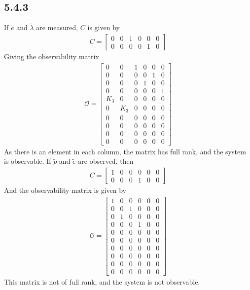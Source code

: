 \subsection*{5.4.3}
If $\tilde{e}$ and $\tilde{\lambda}$ are measured, $C$ is given by
\begin{align*}
C =
\begin{bmatrix}
    0 & 0 & 1 & 0 & 0 & 0\\
    0 & 0 & 0 & 0 & 1 & 0
\end{bmatrix}
\end{align*}
Giving the observability matrix
\begin{align*}
\mathcal{O} =
\begin{bmatrix}
    0 & 0 & 1 & 0 & 0 & 0\\
    0 & 0 & 0 & 0 & 1 & 0\\
    0 & 0 & 0 & 1 & 0 & 0\\
    0 & 0 & 0 & 0 & 0 & 1\\
    K_3 & 0 & 0 & 0 & 0 & 0\\
    0 & K_3 & 0 & 0 & 0 & 0\\
    0 & 0 & 0 & 0 & 0 & 0\\
    0 & 0 & 0 & 0 & 0 & 0\\
    0 & 0 & 0 & 0 & 0 & 0\\
    0 & 0 & 0 & 0 & 0 & 0
\end{bmatrix}
\end{align*}
As there is an element in each column, the matrix has full rank, and the system is observable. If $\tilde{p}$ and $\tilde{e}$ are observed, then
\begin{align*}
C =
\begin{bmatrix}
    1 & 0 & 0 & 0 & 0 & 0\\
    0 & 0 & 0 & 1 & 0 & 0
\end{bmatrix}
\end{align*}
And the observability matrix is given by
\begin{align*}
\mathcal{O} =
\begin{bmatrix}
    1 & 0 & 0 & 0 & 0 & 0\\
    0 & 0 & 1 & 0 & 0 & 0\\
    0 & 1 & 0 & 0 & 0 & 0\\
    0 & 0 & 0 & 1 & 0 & 0\\
    0 & 0 & 0 & 0 & 0 & 0\\
    0 & 0 & 0 & 0 & 0 & 0\\
    0 & 0 & 0 & 0 & 0 & 0\\
    0 & 0 & 0 & 0 & 0 & 0\\
    0 & 0 & 0 & 0 & 0 & 0\\
    0 & 0 & 0 & 0 & 0 & 0
\end{bmatrix}
\end{align*}
This matrix is not of full rank, and the system is not observable.
